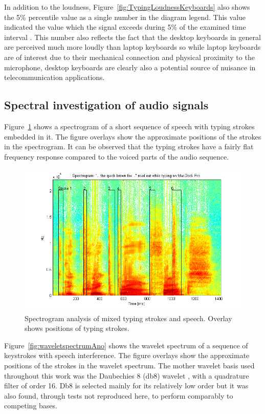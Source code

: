 In addition to the loudness, Figure~\ref{fig:TypingLoudnessKeyboards} also shows the 5\% percentile value as a single number in the diagram legend. This value indicated the value which the signal exceeds during 5\% of the examined time interval \cite{Hauswirth2013}. This number also reflects the fact that the desktop keyboards in general are perceived much more loudly than laptop keyboards so while laptop keyboards are of interest due to their mechanical connection and physical proximity to the microphone, desktop keyboards are clearly also a potential source of nuisance in telecommunication applications.

\subsection{Spectral investigation of audio signals}
Figure~\ref{fig:spectrogramMarkedTapsBrownFox} shows a spectrogram of a short sequence of speech with typing strokes embedded in it. The figure overlays show the approximate positions of the strokes in the spectrogram. It can be observed that the typing strokes have a fairly flat frequency response compared to the voiced parts of the audio sequence.

\begin{figure}[!] %
\centering
\includegraphics[width=150mm]{spectrogramMarkedTapsBrownFox.png}
\caption{Spectrogram analysis of mixed typing strokes and speech. Overlay shows positions of typing strokes.}\label{fig:spectrogramMarkedTapsBrownFox}
\end{figure}

Figure~\ref{fig:waveletspectrumAno} shows the wavelet spectrum of a sequence of keystrokes with speech interference. The figure overlays show the approximate positions of the strokes in the wavelet spectrum. The mother wavelet basis used throughout this work was the Daubechies 8 (db8) wavelet \cite{Daubechies1992}, with a quadrature filter of order 16. Db8 is selected mainly for its relatively low order but it was also found, through tests not reproduced here, to perform comparably to competing bases.

